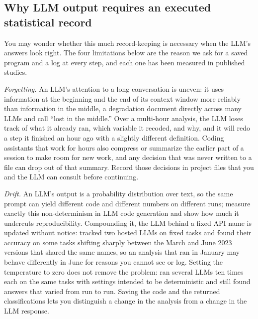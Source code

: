 \subsection{Why LLM output requires an executed statistical record}\label{sec:llm-limits}
You may wonder whether this much record-keeping is necessary when the LLM's answers look right. The four limitations below are the reason we ask for a saved program and a log at every step, and each one has been measured in published studies.

\emph{Forgetting.} An LLM's attention to a long conversation is uneven: it uses information at the beginning and the end of its context window more reliably than information in the middle, a degradation \textcite{liu2024lost} document directly across many LLMs and call \enquote{lost in the middle.} Over a multi-hour analysis, the LLM loses track of what it already ran, which variable it recoded, and why, and it will redo a step it finished an hour ago with a slightly different definition. Coding assistants that work for hours also compress or summarize the earlier part of a session to make room for new work, and any decision that was never written to a file can drop out of that summary. Record those decisions in project files that you and the LLM can consult before continuing.

\emph{Drift.} An LLM's output is a probability distribution over text, so the same prompt can yield different code and different numbers on different runs; \textcite{ouyang2025nondeterminism} measure exactly this non-determinism in LLM code generation and show how much it undercuts reproducibility. Compounding it, the LLM behind a fixed API name is updated without notice: \textcite{chen2023drift} tracked two hosted LLMs on fixed tasks and found their accuracy on some tasks shifting sharply between the March and June 2023 versions that shared the same names, so an analysis that ran in January may behave differently in June for reasons you cannot see or log. Setting the temperature to zero does not remove the problem: \textcite{atil2024nondeterminism} ran several LLMs ten times each on the same tasks with settings intended to be deterministic and still found answers that varied from run to run. Saving the code and the returned classifications lets you distinguish a change in the analysis from a change in the LLM response.

